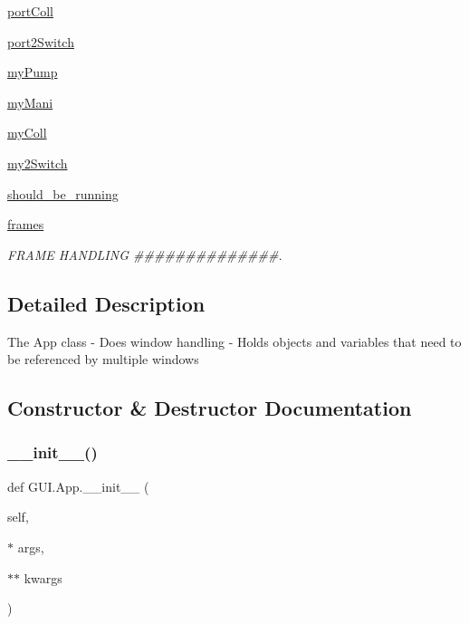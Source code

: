 \begin{DoxyCompactItemize}
\mbox{\hyperlink{class_g_u_i_1_1_app_aa87531923c2b8e9e720234f4720c7232}{port\+Coll}}
\item 
\mbox{\hyperlink{class_g_u_i_1_1_app_abe63872b7a9cf8c94c4464a982cc3c50}{port2\+Switch}}
\item 
\mbox{\hyperlink{class_g_u_i_1_1_app_a3727c32496fd20240638583ece4950b2}{my\+Pump}}
\item 
\mbox{\hyperlink{class_g_u_i_1_1_app_a80a689f6903706036b501f15d692fdea}{my\+Mani}}
\item 
\mbox{\hyperlink{class_g_u_i_1_1_app_a7f98c20fa1724e98c57e3a9b33cf4d06}{my\+Coll}}
\item 
\mbox{\hyperlink{class_g_u_i_1_1_app_a7e5283000d01a86a8ae079ec390528cd}{my2\+Switch}}
\item 
\mbox{\hyperlink{class_g_u_i_1_1_app_a58cdd38768a4e442d47fc18c9926e5db}{should\+\_\+be\+\_\+running}}
\item 
\mbox{\hyperlink{class_g_u_i_1_1_app_a20a736d09e838e4c083949e67d001ab0}{frames}}
\begin{DoxyCompactList}\small\item\em F\+R\+A\+ME H\+A\+N\+D\+L\+I\+NG \#\#\#\#\#\#\#\#\#\#\#\#\#\#. \end{DoxyCompactList}\end{DoxyCompactItemize}


\subsection{Detailed Description}
\begin{DoxyVerb}The App class
- Does window handling
- Holds objects and variables that need to be referenced by multiple windows
\end{DoxyVerb}
 

\subsection{Constructor \& Destructor Documentation}
\mbox{\label{class_g_u_i_1_1_app_a70ee92bd005059ecc9765240ef6e8f5b}} 
\subsubsection{\texorpdfstring{\_\_init\_\_()}{\_\_init\_\_()}}
{\footnotesize\ttfamily def G\+U\+I.\+App.\+\_\+\+\_\+init\+\_\+\+\_\+ (\begin{DoxyParamCaption}\item[{}]{self,  }\item[{$\ast$}]{args,  }\item[{$\ast$$\ast$}]{kwargs }\end{DoxyParamCaption})}


